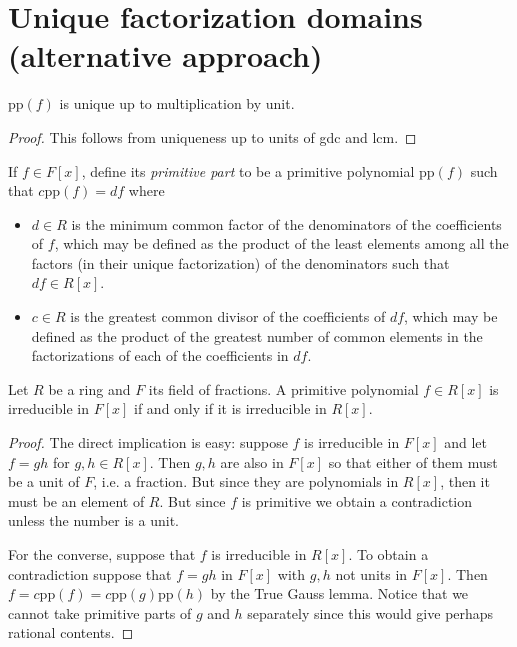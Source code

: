 \section{Unique factorization domains (alternative approach)}
\label{section-UFD-alternative}


\begin{lemma}
\label{lemma-primitive-part-unique-up-to-unit}
$\text{pp}(f)$ is unique up to multiplication by unit.
\end{lemma}

\begin{proof}
This follows from uniqueness up to units of gdc and lcm.
\end{proof}

\begin{definition}
\label{definition-primitive-part}
If $f\in F[x]$, define its {\it primitive part} to be a primitive polynomial
$\text{pp}(f)$ such that $c\text{pp}(f)=df$ where
\begin{itemize}
\item $d\in R$ is the minimum common
factor of the denominators of the coefficients of $f$, which may be defined as
the product of the least elements among all the factors (in their unique
factorization) of the denominators such that $df \in R[x]$.
\item $c\in R$ is the greatest common divisor of the coefficients of $df$, which
may be defined as the product of the greatest number of common elements in the
factorizations of each of the coefficients in $df$.
\end{itemize}
\end{definition}

\begin{lemma}[Gauss]
\label{lemma-Gauss}
Let $R$ be a ring and $F$ its field of fractions. A primitive polynomial $f\in
R[x]$ is irreducible in $F[x]$ if and only if it is irreducible in $R[x]$.
\end{lemma}

\begin{proof}
The direct implication is easy: suppose $f$ is irreducible in $F[x]$ and let
$f=gh$ for $g,h\in R[x]$. Then $g,h$ are also in $F[x]$ so that either of them
must be a unit of $F$, i.e. a fraction. But since they are polynomials in
$R[x]$, then it must be an element of $R$. But since $f$ is primitive we obtain
a contradiction unless the number is a unit.

For the converse, suppose that $f$ is irreducible in $R[x]$. To obtain a 
contradiction suppose that $f=gh$ in $F[x]$ with $g,h$ not units in $F[x]$.
Then $f=c\text{pp}(f)=c\text{pp}(g)\text{pp}(h)$ by the True Gauss lemma. 
Notice that we cannot take primitive parts of $g$ and $h$ separately since this
would give perhaps rational contents.
\end{proof}


